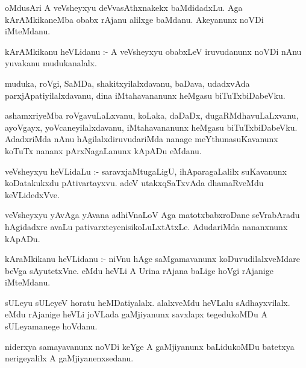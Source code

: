\documentclass{article}
\begin{document}
\begin{mn}
oMdusAri  A  veVsheyxyu  deVvasAthxnakekx  baMdidadxLu.  Aga  kArAMkikaneMba  obabx  rAjanu  alilxge  baMdanu.  
Akeyanunx  noVDi  iMteMdanu.
\end{mn}

\begin{mn}
kArAMkikanu  heVLidanu :- A  veVsheyxyu  obabxLeV  iruvudanunx  noVDi  nAnu  yuvakanu  mudukanalalx.
\end{mn}

\begin{mn}
muduka,  roVgi,  SaMDa,  shakitxyilalxdavanu,  baDava,  udadxvAda  parxjApatiyilalxdavanu,  dina  
iMtahavananunx  heMgasu  biTuTxbiDabeVku.
\end{mn}

\begin{mn}
ashamxriyeMba  roVgavuLaLxvanu,  koLaka,  daDaDx,  dugaRMdhavuLaLxvanu,  ayoVgayx,  yoVcaneyilalxdavanu,  
iMtahavananunx  heMgasu  biTuTxbiDabeVku.  AdadxriMda  nAnu  hAgilalxdiruvudariMda  nanage  
meYthunasuKavanunx  koTuTx  nananx  pArxNagaLanunx  kApADu  eMdanu.
\end{mn}

\begin{mn}
veVsheyxyu  heVLidaLu :- saravxjaMtugaLigU,  ihAparagaLalilx  suKavanunx  koDatakukxdu  pAtivartayxvu.  
adeV  utakxqSaTxvAda  dhamaRveMdu  keVLidedxVve.
\end{mn}

\begin{mn}
veVsheyxyu  yAvAga  yAvana  adhiVnaLoV  Aga  matotxbabxroDane  seVrabAradu  hAgidadxre  avaLu  
pativarxteyenisikoLuLxtAtxLe.  AdudariMda  nananxnunx  kApADu.
\end{mn}

\begin{mn}
kAraMkikanu  heVLidanu :- niVnu  hAge  saMgamavanunx  koDuvudilalxveMdare  beVga  sAyutetxVne.  
eMdu  heVLi  A  Urina  rAjana  baLige  hoVgi  rAjanige  iMteMdanu.
\end{mn}

\begin{mn}
sULeyu  sULeyeV  horatu  heMDatiyalalx.  alalxveMdu  heVLalu  sAdhayxvilalx.  eMdu  rAjanige  heVLi  
joVLada  gaMjiyanunx  savxlapx  tegedukoMDu  A  sULeyamanege  hoVdanu.
\end{mn}

\begin{mn}
niderxya  samayavanunx  noVDi  keYge  A  gaMjiyanunx  baLidukoMDu  batetxya  nerigeyalilx  A  gaMjiyanenxsedanu.
\end{mn}
\end{document}
